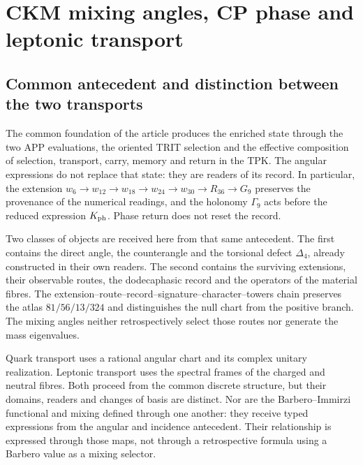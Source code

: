 
\section{CKM mixing angles, CP phase and leptonic transport}
\label{ii:sec:ii-propagacion-angular}

\subsection{Common antecedent and distinction between the two transports}

The common foundation of the article produces the enriched state through the two APP evaluations, the oriented TRIT selection and the effective composition of selection, transport, carry, memory and return in the TPK. The angular expressions do not replace that state: they are readers of its record. In particular, the extension \(w_6\to w_{12}\to w_{18}\to w_{24}\to w_{30}\to R_{36}\to G_9\) preserves the provenance of the numerical readings, and the holonomy \(\Gamma_9\) acts before the reduced expression \(K_{\rm ph}\). Phase return does not reset the record.

Two classes of objects are received here from that same antecedent. The first contains the direct angle, the counterangle and the torsional defect \(\Delta_4\), already constructed in their own readers. The second contains the surviving extensions, their observable routes, the dodecaphasic record and the operators of the material fibres. The extension--route--record--signature--character--towers chain preserves the atlas \(81/56/13/324\) and distinguishes the null chart from the positive branch. The mixing angles neither retrospectively select those routes nor generate the mass eigenvalues.

Quark transport uses a rational angular chart and its complex unitary realization. Leptonic transport uses the spectral frames of the charged and neutral fibres. Both proceed from the common discrete structure, but their domains, readers and changes of basis are distinct. Nor are the Barbero--Immirzi functional and mixing defined through one another: they receive typed expressions from the angular and incidence antecedent. Their relationship is expressed through those maps, not through a retrospective formula using a Barbero value as a mixing selector.

